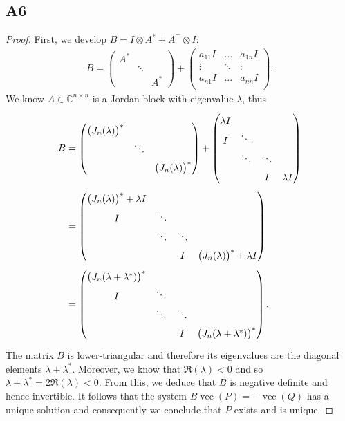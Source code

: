 \documentclass[11pt]{article}
\newcommand{\kp}{\otimes}
\DeclareMathOperator{\vect}{vec}
\newcommand{\complex}{\mathbb{C}} %
\begin{document}
\subsection*{A6}
\begin{proof}
First, we develop $B=I\kp A^*+A^\top\kp I$:
\begin{align*}
    B=
    \begin{pmatrix}
    A^* & & \\
    &\ddots&\\
    & & A^*
    \end{pmatrix}+
    \begin{pmatrix}
    a_{11} I & \dots & a_{1n} I\\
    \vdots & \ddots & \vdots\\
    a_{n1} I & \dots & a_{nn} I\\
    \end{pmatrix}.
\end{align*}
We know $A\in\complex^{n\times n}$ is a Jordan block with eigenvalue $\lambda$, thus
\begin{align*}
    B&=
    \renewcommand{\arraystretch}{1.5}
    \begin{pmatrix}
    \big(J_n(\lambda)\big)^* & & \\
    &\ddots&\\
    & & \big(J_n(\lambda)\big)^*
    \end{pmatrix}+
    \begin{pmatrix}
    \lambda I & & &\\
    I & \ddots & &\\
    & \ddots & \ddots &\\
    & & I & \lambda I
    \end{pmatrix}\\
    &=\begin{pmatrix}
    \big(J_n(\lambda)\big)^*+\lambda I &  &  & \\
    I & \ddots & &\\
    & \ddots & \ddots &\\
    & & I & \big(J_n(\lambda)\big)^*+\lambda I
    \end{pmatrix}\\
    &=\begin{pmatrix}
    \big(J_n(\lambda+\lambda^*)\big)^* & & & \\
    I & \ddots & &\\
    & \ddots & \ddots &\\
    & & I & \big(J_n(\lambda+\lambda^*)\big)^*
    \end{pmatrix}.
\end{align*}
The matrix \(B\) is lower-triangular and therefore its eigenvalues are the diagonal elements $\lambda+\lambda^*$.
Moreover, we know that $\Re(\lambda)<0$ and so $\lambda+\lambda^*=2 \Re(\lambda)<0$.
From this, we deduce that $B$ is negative definite and hence invertible.
It follows that the system $B\vect(P)=-\vect(Q)$ has a unique solution and consequently we conclude that \(P\) exists and is unique.
\end{proof}
\end{document}
